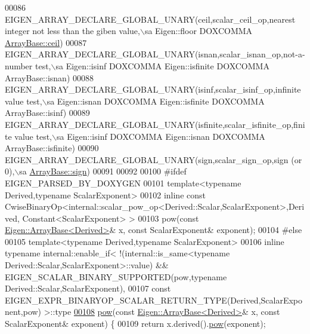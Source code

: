 \begin{DoxyCode}
00086   EIGEN\_ARRAY\_DECLARE\_GLOBAL\_UNARY(ceil,scalar\_ceil\_op,nearest integer not less than the giben value,\(\backslash\)sa 
      Eigen::floor DOXCOMMA \hyperlink{group___core___module_a644fa9e672def0cd2bdab1f4efe6400e}{ArrayBase::ceil})
00087   EIGEN\_ARRAY\_DECLARE\_GLOBAL\_UNARY(isnan,scalar\_isnan\_op,not-a-number test,\(\backslash\)sa Eigen::isinf DOXCOMMA 
      Eigen::isfinite DOXCOMMA ArrayBase::isnan)
00088   EIGEN\_ARRAY\_DECLARE\_GLOBAL\_UNARY(isinf,scalar\_isinf\_op,infinite value test,\(\backslash\)sa Eigen::isnan DOXCOMMA 
      Eigen::isfinite DOXCOMMA ArrayBase::isinf)
00089   EIGEN\_ARRAY\_DECLARE\_GLOBAL\_UNARY(isfinite,scalar\_isfinite\_op,finite value test,\(\backslash\)sa Eigen::isinf DOXCOMMA 
      Eigen::isnan DOXCOMMA ArrayBase::isfinite)
00090   EIGEN\_ARRAY\_DECLARE\_GLOBAL\_UNARY(sign,scalar\_sign\_op,sign (or 0),\(\backslash\)sa 
      \hyperlink{group___core___module_a756077be83779c575e95deb4361a6dd6}{ArrayBase::sign})
00091   
00092   
00100 \textcolor{preprocessor}{#ifdef EIGEN\_PARSED\_BY\_DOXYGEN}
00101   \textcolor{keyword}{template}<\textcolor{keyword}{typename} Derived,\textcolor{keyword}{typename} ScalarExponent>
00102   \textcolor{keyword}{inline} \textcolor{keyword}{const} CwiseBinaryOp<internal::scalar\_pow\_op<Derived::Scalar,ScalarExponent>,Derived,
      Constant<ScalarExponent> >
00103   pow(\textcolor{keyword}{const} \hyperlink{group___core___module_class_eigen_1_1_array_base}{Eigen::ArrayBase<Derived>}& x, \textcolor{keyword}{const} ScalarExponent& exponent);
00104 \textcolor{preprocessor}{#else}
00105   \textcolor{keyword}{template}<\textcolor{keyword}{typename} Derived,\textcolor{keyword}{typename} ScalarExponent>
00106   \textcolor{keyword}{inline} \textcolor{keyword}{typename} internal::enable\_if<   !(internal::is\_same<typename
       Derived::Scalar,ScalarExponent>::value) && EIGEN\_SCALAR\_BINARY\_SUPPORTED(pow,\textcolor{keyword}{typename} Derived::Scalar,ScalarExponent),
00107           \textcolor{keyword}{const} EIGEN\_EXPR\_BINARYOP\_SCALAR\_RETURN\_TYPE(Derived,ScalarExponent,pow) >::type
\hyperlink{group___core___module_ab6dc101d82e8228a19a8840e3a29c1c9}{00108}   \hyperlink{group___core___module_ab6dc101d82e8228a19a8840e3a29c1c9}{pow}(\textcolor{keyword}{const} \hyperlink{group___core___module_class_eigen_1_1_array_base}{Eigen::ArrayBase<Derived>}& x, \textcolor{keyword}{const} ScalarExponent& exponent) \{
00109     \textcolor{keywordflow}{return} x.derived().\hyperlink{group___core___module_ab6dc101d82e8228a19a8840e3a29c1c9}{pow}(exponent);

\end{DoxyCode}
